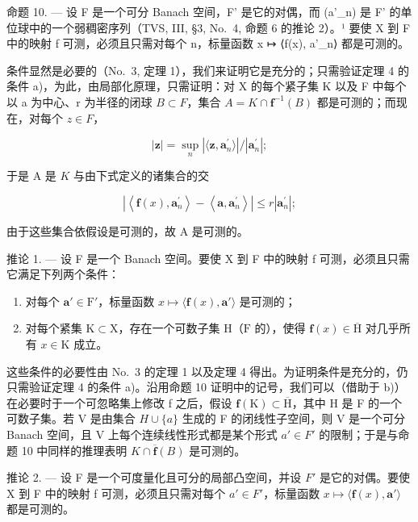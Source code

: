命题 10. --- 设 F 是一个可分 Banach 空间，F' 是它的对偶，而 (a'\_n) 是 F' 的单位球中的一个弱稠密序列（TVS, III, §3, No.~4, 命题 6 的推论 2）。¹ 要使 X 到 F 中的映射 f 可测，必须且只需对每个 n，标量函数 x ↦ ⟨f(x), a'\_n⟩ 都是可测的。

条件显然是必要的（No.~3, 定理 1），我们来证明它是充分的；只需验证定理 4 的条件 a)，为此，由局部化原理，只需证明：对 X 的每个紧子集 K 以及 F 中每个以 a 为中心、r 为半径的闭球 \(B \subset F\)，集合 \(A = K \cap \mathbf{f}^{-1}(B)\) 都是可测的；而现在，对每个 \(z \in F\)，

\[
| \mathbf {z} | = \sup _ {n} | \langle \mathbf {z}, \mathbf {a} _ {n} ^ {\prime} \rangle | / | \mathbf {a} _ {n} ^ {\prime} |;
\]

于是 A 是 \(K\) 与由下式定义的诸集合的交

\[
\left| \left\langle \mathbf {f} (x), \mathbf {a} _ {n} ^ {\prime} \right\rangle - \left\langle \mathbf {a}, \mathbf {a} _ {n} ^ {\prime} \right\rangle \right| \leqslant r \left| \mathbf {a} _ {n} ^ {\prime} \right|;
\]

由于这些集合依假设是可测的，故 A 是可测的。

推论 1. --- 设 F 是一个 Banach 空间。要使 X 到 F 中的映射 f 可测，必须且只需它满足下列两个条件：

\begin{enumerate}
\def\labelenumi{\alph{enumi})}
\tightlist
\item
  对每个 \(\mathbf{a}' \in \mathrm{F}'\)，标量函数 \(x \mapsto \langle \mathbf{f}(x), \mathbf{a}' \rangle\) 是可测的；
\item
  对每个紧集 \(\mathrm{K} \subset \mathrm{X}\)，存在一个可数子集 \(\mathrm{H}\)（\(\mathrm{F}\) 的），使得 \(\mathbf{f}(x) \in \overline{\mathrm{H}}\) 对几乎所有 \(x \in \mathrm{K}\) 成立。
\end{enumerate}

这些条件的必要性由 No.~3 的定理 1 以及定理 4 得出。为证明条件是充分的，仍只需验证定理 4 的条件 a)。沿用命题 10 证明中的记号，我们可以（借助于 b)）在必要时于一个可忽略集上修改 f 之后，假设 \(\mathbf{f}(\mathrm{K}) \subset \overline{\mathrm{H}}\)，其中 H 是 F 的一个可数子集。若 V 是由集合 \(H \cup \{a\}\) 生成的 F 的闭线性子空间，则 V 是一个可分 Banach 空间，且 V 上每个连续线性形式都是某个形式 \(a' \in F'\) 的限制；于是与命题 10 中同样的推理表明 \(K \cap \overline{\mathbf{f}}(B)\) 是可测的。

推论 2. --- 设 F 是一个可度量化且可分的局部凸空间，并设 \(F'\) 是它的对偶。要使 X 到 F 中的映射 f 可测，必须且只需对每个 \(a' \in F'\)，标量函数 \(x \mapsto \langle \mathbf{f}(x), \mathbf{a}' \rangle\) 都是可测的。

